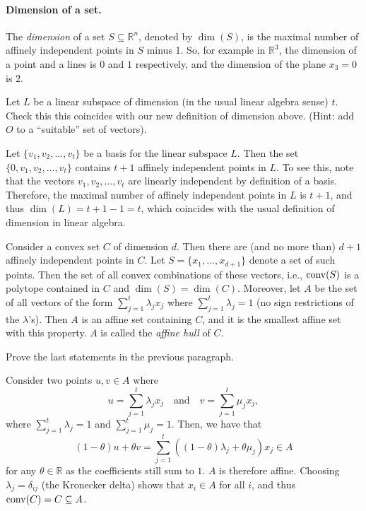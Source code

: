 \paragraph{Dimension of a set.}
The \emph{dimension} of a set $S \subseteq \mathbb{R}^n$, denoted by $\dim(S)$, is the maximal number of affinely independent points in $S$ minus 1.
So, for example in $\mathbb{R}^3$, the dimension of a point and a lines is $0$ and $1$ respectively, and the dimension of the plane $x_3 = 0$ is $2$.

\begin{exercise}
  Let $L$ be a linear subspace of dimension (in the usual linear algebra sense) $t$.
  Check this this coincides with our new definition of dimension above.
  (Hint: add $O$ to a ``suitable'' set of vectors).
\end{exercise}

\begin{solution}
  Let $\{v_1, v_2, \ldots, v_t\}$ be a basis for the linear subspace $L$.
  Then the set $\{0, v_1, v_2, \ldots, v_t\}$ contains $t + 1$ affinely independent points in $L$.
  To see this, note that the vectors $v_1, v_2, \ldots, v_t$ are linearly independent by definition of a basis.
  Therefore, the maximal number of affinely independent points in $L$ is $t + 1$, and thus $\dim(L) = t + 1 - 1 = t$, which coincides with the usual definition of dimension in linear algebra.
\end{solution}

\begin{exercise}
  Consider a convex set $C$ of dimension $d$.
  Then there are (and no more than) $d + 1$ affinely independent points in $C$.
  Let $S = \{ x_1, \ldots, x_{d+1} \}$ denote a set of such points.
  Then the set of all convex combinations of these vectors, i.e., $\operatorname*{conv}(S)$ is a polytope contained in $C$ and $\dim(S) = \dim(C)$.
  Moreover, let $A$ be the set of all vectors of the form $\sum_{j = 1}^{t}\lambda_j x_j$ where $\sum_{j = 1}^{t} \lambda_j = 1$ (no sign restrictions of the $\lambda$'s).
  Then $A$ is an affine set containing $C$, and it is the smallest affine set with this property.
  $A$ is called the \emph{affine hull} of $C$.

  Prove the last statements in the previous paragraph.
\end{exercise}

\begin{solution}
  Consider two points $u, v \in A$ where
  \begin{equation}
    u = \sum_{j = 1}^{t} \lambda_j x_j
    \quad\text{and}\quad
    v = \sum_{j = 1}^{t} \mu_j x_j,
  \end{equation}
  where $\sum_{j = 1}^{t} \lambda_j = 1$ and $\sum_{j = 1}^{t} \mu_j = 1$.
  Then, we have that
  \begin{equation}
    (1 - \theta)u + \theta v
    = \sum_{j = 1}^{t} ((1 - \theta) \lambda_j + \theta \mu_j) x_j \in A
  \end{equation}
  for any $\theta \in \mathbb{R}$ as the coefficients still sum to $1$.
  $A$ is therefore affine.
  Choosing $\lambda_j = \delta_{ij}$ (the Kronecker delta) shows that $x_i \in A$ for all $i$, and thus $\operatorname*{conv}(C) = C \subseteq A$.
\end{solution}

